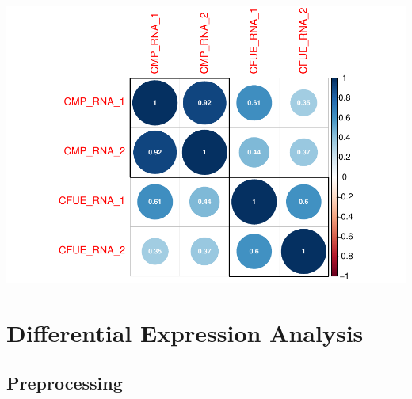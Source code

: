 \documentclass[
]{article}
\begin{document}
\includegraphics{RNA_Analysis_23_files/figure-latex/cor plots-1.pdf}

\hypertarget{differential-expression-analysis}{%
\section{Differential Expression
Analysis}\label{differential-expression-analysis}}

\hypertarget{preprocessing}{%
\subsection{Preprocessing}\label{preprocessing}}
\end{document}
